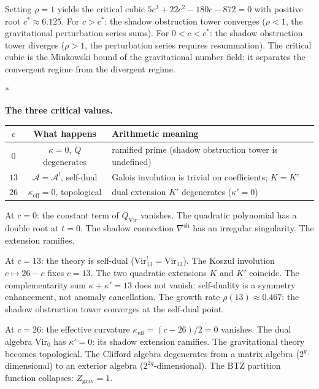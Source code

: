 \documentclass[11pt]{article}
\newcommand{\cA}{\mathcal{A}}
\newcommand{\sep}{\bigskip\begin{center}$*$\end{center}\medskip}
\begin{document}
Setting $\rho = 1$ yields the critical cubic
$5c^3 + 22c^2 - 180c - 872 = 0$ with positive root
$c^* \approx 6.125$.  For $c > c^*$: the shadow obstruction tower
converges ($\rho < 1$, the gravitational perturbation
series sums).  For $0 < c < c^*$: the shadow obstruction tower diverges
($\rho > 1$, the perturbation series requires resummation).
The critical cubic is the Minkowski bound of the gravitational
number field: it separates the convergent regime from the
divergent regime.

\sep

\noindent\textbf{The three critical values.}\enspace
\begin{center}
\small
\renewcommand{\arraystretch}{1.15}
\begin{tabular}{@{}ccl@{}}
$c$ & \textbf{What happens} & \textbf{Arithmetic meaning} \\
\hline
$0$ & $\kappa = 0$, $Q$ degenerates & ramified prime
  (shadow obstruction tower is undefined) \\[3pt]
$13$ & $\cA = \cA^!$, self-dual
  & Galois involution is trivial on coefficients;
  $K = K'$ \\[3pt]
$26$ & $\kappa_{\mathrm{eff}} = 0$, topological & dual
  extension $K'$ degenerates ($\kappa' = 0$)
\end{tabular}
\end{center}

\medskip

At $c = 0$: the constant term of $Q_{\mathrm{Vir}}$ vanishes.
The quadratic polynomial has a double root at $t = 0$.  The
shadow connection $\nabla^{\mathrm{sh}}$ has an irregular
singularity.  The extension ramifies.

At $c = 13$: the theory is self-dual ($\mathrm{Vir}_{13}^!
= \mathrm{Vir}_{13}$).  The Koszul involution $c \mapsto 26-c$
fixes $c = 13$.  The two quadratic extensions $K$ and $K'$
coincide.  The complementarity sum $\kappa + \kappa' = 13$
does not vanish: self-duality is a symmetry enhancement, not
anomaly cancellation.  The growth rate $\rho(13) \approx 0.467$:
the shadow obstruction tower converges at the self-dual point.

At $c = 26$: the effective curvature $\kappa_{\mathrm{eff}}
= (c{-}26)/2 = 0$ vanishes.  The dual algebra
$\mathrm{Vir}_0$ has $\kappa' = 0$: its shadow extension
ramifies.  The gravitational theory becomes topological.  The
Clifford algebra degenerates from a matrix algebra
($2^g$-dimensional) to an exterior algebra
($2^{2g}$-dimensional).  The BTZ partition function collapses:
$Z_{\mathrm{grav}} = 1$.
\end{document}
